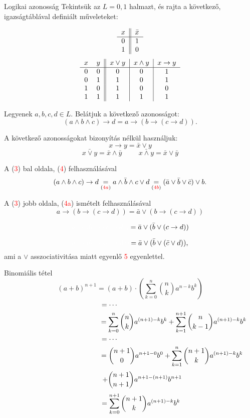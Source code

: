 \documentclass{article}
\begin{document}
Logikai azonosság
Tekintsük az $ L = {0, 1} $ halmazt, és rajta a következő, igazságtáblával definiált műveleteket:

\[
\begin{tabular}{c||c}
 $x$ & $\bar{x}$  \\\hline
 0 & 1 \\
 1 & 0 \\
\end{tabular}
\]
\[
\begin{tabular}{c c||c|c|c}
$x$ & $y$ & $x \vee  y$ & $x \wedge y$ & $x \rightarrow y$\\\hline
0 & 0 & 0 & 0 & 1\\ 
0 & 1 & 1 & 0 & 1\\ 
1 & 0 & 1 & 0 & 0\\   
1 & 1 & 1 & 1 & 1\\ 
\end{tabular}
\]

Legyenek $a,b,c,d \in L.$ Belátjuk a következő azonosságot:
\[
(a \wedge b \wedge c) \rightarrow d = a \rightarrow (b \rightarrow (c \rightarrow d)).
\]

A következő azonosságokat bizonyítás nélkül használjuk:
\[
x \rightarrow y = \bar{x} \vee y
\]
\[
\bar{x \vee y} = \bar{x} \wedge \bar{y}
\hspace{1cm}
\bar{x \wedge y} = \bar{x} \vee \bar{y}
\]

A (\textcolor{red}{3}) bal oldala, (\textcolor{red}{4}) felhasználásával
\[
(a\wedge b \wedge c) \rightarrow d \underset{(\textcolor{red}{4a})}{=} \bar{a \wedge b \wedge c} \vee d \underset{(\textcolor{red}{4b})}{=} (\bar{a} \vee \bar{b}  \vee \bar{c}) \vee b.
\]

A (\textcolor{red}{3}) jobb oldala, (\textcolor{red}{4a}) ismételt felhasználásával
\[
a \rightarrow (b  \rightarrow (c  \rightarrow d)) = \bar{a} \vee (b  \rightarrow (c  \rightarrow d))
\]

\[
\textcolor{white}{a \rightarrow (b  \rightarrow (c  \rightarrow d))} = \bar{a} \vee (\bar{b}  \vee (c  \rightarrow d))
\]

\[
\textcolor{white}{a \rightarrow (b  \rightarrow (c  \rightarrow d))} = \bar{a} \vee (\bar{b} \vee (\bar{c}  \vee d)),
\]
ami a $\vee$ asszociativitása miatt egyenlő \textcolor{red}{5} egyenlettel.

\newpage
Binomiális tétel
\[
(a+b)^{n+1}
= (a+b) \cdot \left( \sum_{k=0}^n \binom{n}{k} a^{n-k}b^k \right)
\]
\[
=\cdots \hspace{2,1cm}
\]
\[
\hspace{4,4cm}
= \sum_{k=0}^n \binom{n}{k} a^{(n+1)-k}b^k
+ \sum_{k=1}^{n+1} \binom{n}{k-1} a^{(n+1)-k}b^{k}
\]
\[
=\cdots \hspace{2,1cm}
\]
\[
\hspace{4,2cm}
= \binom{n+1}{0} a^{n+1-0} b^0
+ \sum_{k=1}^n \binom{n+1}{k} a^{(n+1)-k}b^k
\]
\[
\hspace{1,2cm}
+ \binom{n+1}{n+1} a^{n+1-(n+1)} b^{n+1}
\]
\[
\hspace{1,1cm}
= \sum_{k=0}^{n+1} \binom{n+1}{k} a^{(n+1)-k}b^k
\]
\end{document}
